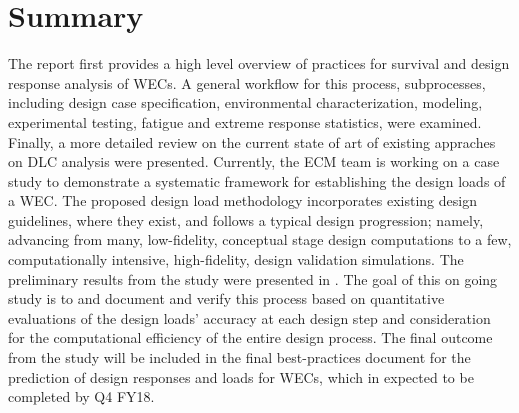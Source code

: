 \section{Summary}
The report first provides a high level overview of practices for survival and design response analysis of WECs.
A general workflow for this process, subprocesses, including design case specification, environmental characterization, modeling, experimental testing, fatigue and extreme response statistics, were examined.
Finally, a more detailed review on the current state of art of existing appraches on DLC analysis were presented.
Currently, the ECM team is working on a case study to demonstrate a systematic framework for establishing the design loads of a WEC. The proposed design load methodology incorporates existing design guidelines, where they exist, and follows a typical design progression; namely, advancing from many, low-fidelity, conceptual stage design computations to a few, computationally intensive, high-fidelity, design validation simulations. The preliminary results from the study were presented in \cite{VanRij2018}. The goal of this on going study is to and document and verify this process based on quantitative evaluations of the design loads' accuracy at each design step and consideration for the computational efficiency of the entire design process. The final outcome from the study will be included in the final best-practices document for the prediction of design responses and loads for WECs, which in expected to be completed by Q4 FY18.
